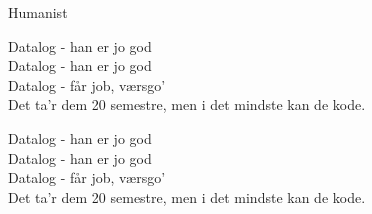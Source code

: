 \begin{song}{Humanist}
  \begin{SBChorus}
    Datalog - han er jo god\\
    Datalog - han er jo god\\
    Datalog - får job, værsgo'\\
    Det ta'r dem 20 semestre, men i det mindste kan de kode.
  \end{SBChorus}

  \begin{SBChorus}
    Datalog - han er jo god\\
    Datalog - han er jo god\\
    Datalog - får job, værsgo'\\
    Det ta'r dem 20 semestre, men i det mindste kan de kode.
  \end{SBChorus}

\end{song}